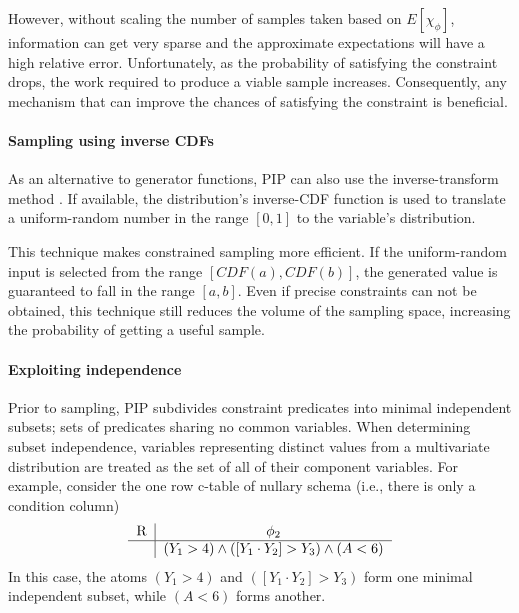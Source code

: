 However, without scaling the number of samples taken based on $E[\chi_\phi]$, information can get very sparse and the approximate expectations will have a high relative error.  Unfortunately, as the probability of satisfying the constraint drops, the work required to produce a viable sample increases.   Consequently, any mechanism that can improve the chances of satisfying the constraint is beneficial.

\paragraph{Sampling using inverse CDFs}
\label{subsec:icdf}
As an alternative to generator functions, PIP can also use the inverse-transform method \cite{lawSimulation}.  If available, the distribution's inverse-CDF function is used to translate a uniform-random number in the range $[0,1]$ to the variable's distribution.  

This technique makes constrained sampling more efficient.  If the uniform-random input is selected from the range $[CDF(a), CDF(b)]$, the generated value is guaranteed to fall in the range $[a, b]$.  Even if precise constraints can not be obtained, this technique still reduces the volume of the sampling space, increasing the probability of getting a useful sample.



\paragraph{Exploiting independence}
\label{subsec:independence}
Prior to sampling, PIP subdivides constraint predicates into minimal independent subsets; sets of predicates sharing no common variables.  When determining subset independence, variables representing distinct values from a multivariate distribution are treated as the set of all of their component variables.  For example, consider the one row c-table of nullary schema (i.e., there is only a condition column)
\[
\begin{tabular}{c|c}
R & $\phi_2$ \\
\hline
& $(Y_1 > 4) \wedge ([Y_1\cdot Y_2] > Y_3) \wedge (A < 6)$ \\
\end{tabular}
\]
In this case, the atoms $(Y_1 > 4)$ and $([Y_1\cdot Y_2] > Y_3)$ form one minimal independent subset, while $(A < 6)$ forms another.


